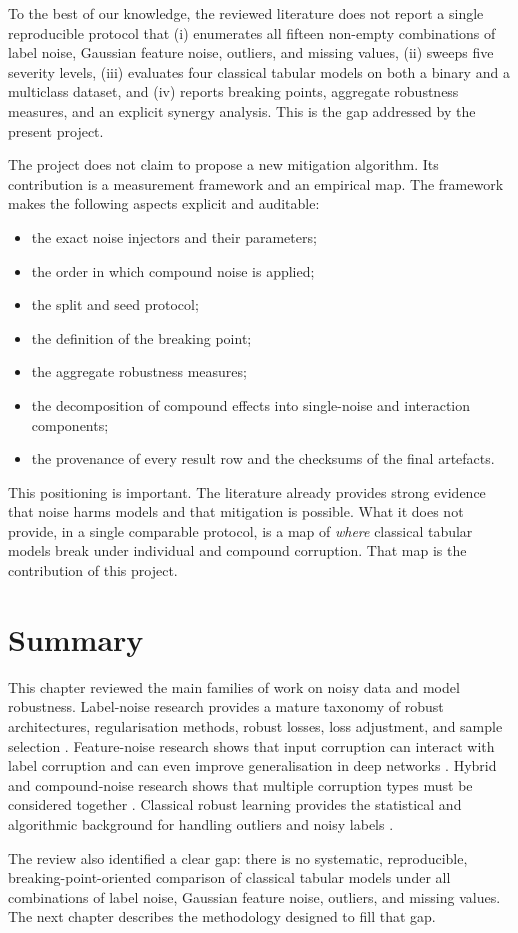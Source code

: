 To the best of our knowledge, the reviewed literature does not report a single reproducible protocol that (i) enumerates all fifteen non-empty combinations of label noise, Gaussian feature noise, outliers, and missing values, (ii) sweeps five severity levels, (iii) evaluates four classical tabular models on both a binary and a multiclass dataset, and (iv) reports breaking points, aggregate robustness measures, and an explicit synergy analysis. This is the gap addressed by the present project.

The project does not claim to propose a new mitigation algorithm. Its contribution is a measurement framework and an empirical map. The framework makes the following aspects explicit and auditable:

\begin{itemize}
  \item the exact noise injectors and their parameters;
  \item the order in which compound noise is applied;
  \item the split and seed protocol;
  \item the definition of the breaking point;
  \item the aggregate robustness measures;
  \item the decomposition of compound effects into single-noise and interaction components;
  \item the provenance of every result row and the checksums of the final artefacts.
\end{itemize}

This positioning is important. The literature already provides strong evidence that noise harms models and that mitigation is possible. What it does not provide, in a single comparable protocol, is a map of \emph{where} classical tabular models break under individual and compound corruption. That map is the contribution of this project.

\section{Summary}

This chapter reviewed the main families of work on noisy data and model robustness. Label-noise research provides a mature taxonomy of robust architectures, regularisation methods, robust losses, loss adjustment, and sample selection \cite{song2023survey}. Feature-noise research shows that input corruption can interact with label corruption and can even improve generalisation in deep networks \cite{zeng2025feature}. Hybrid and compound-noise research shows that multiple corruption types must be considered together \cite{zhang2020hybrid,chen2023compound}. Classical robust learning provides the statistical and algorithmic background for handling outliers and noisy labels \cite{frenay2014classification,huber1964robust}.

The review also identified a clear gap: there is no systematic, reproducible, breaking-point-oriented comparison of classical tabular models under all combinations of label noise, Gaussian feature noise, outliers, and missing values. The next chapter describes the methodology designed to fill that gap.
